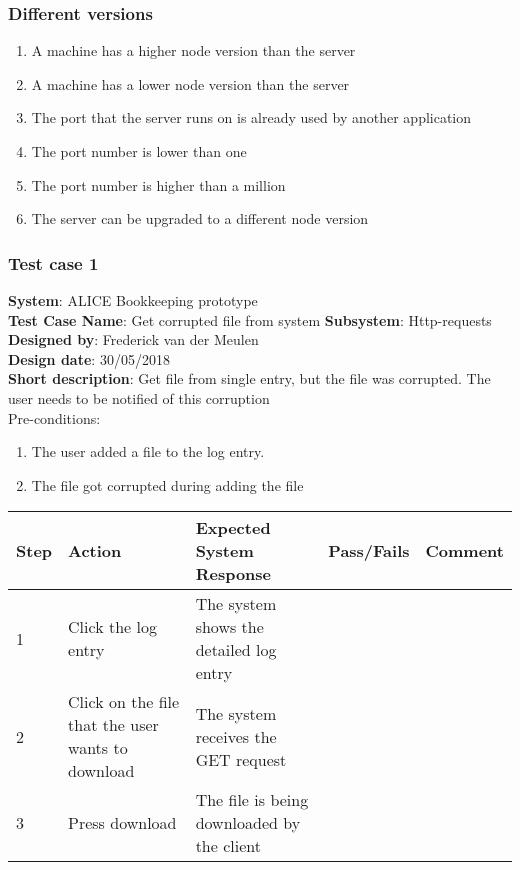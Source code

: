 \subsubsection{Different versions}
\begin{enumerate}
\item A machine has a higher node version than the server
\item A machine has a lower node version than the server
\item The port that the server runs on is already used by another application
\item The port number is lower than one
\item The port number is higher than a million
\item The server can be upgraded to a different node version
\end{enumerate}

\subsubsection{Test case 1}
\textbf{System}:  ALICE Bookkeeping prototype \\
\textbf{Test Case Name}:  Get corrupted file from system
\textbf{Subsystem}:  Http-requests
\textbf{Designed by}:  Frederick van der Meulen\\
\textbf{Design date}: 30/05/2018 \\
\textbf{Short description}: Get file from single entry, but the file was corrupted. The user needs to be notified of this corruption \\

Pre-conditions: \\
\begin{enumerate}
\item The user added a file to the log entry.
\item The file got corrupted during adding the file
\end{enumerate}

\begin{longtable}{ | p{0.8cm} | p{4.5cm} | p{6cm} | p{1.5cm} | p{1.5cm} |}
\hline
Step & Action & Expected System Response & Pass/Fails & Comment \\ \hline
1 & Click the log entry & The system shows the detailed log entry & & \\ \hline
2 & Click on the file that the user wants to download & The system receives the GET request & & \\ \hline
3 & Press download & The file is being downloaded by the client & & \\ \hline
\end{longtable}
